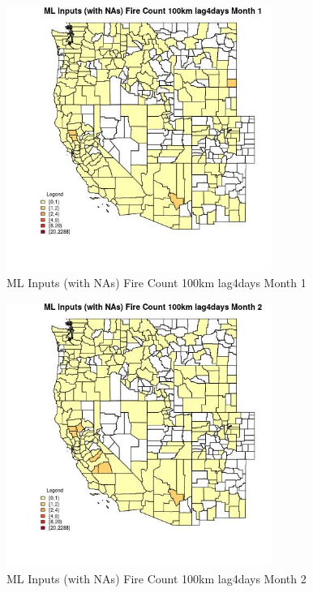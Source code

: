 \begin{figure} 
\centering  
\includegraphics[width=0.77\textwidth]{Code_Outputs/Report_ML_input_PM25_Step4_part_e_de_duplicated_aves_compiled_2019-05-20wNAs_CountyFire_Count_100km_lag4daysmedianMonth1.jpg} 
\caption{\label{fig:Report_ML_input_PM25_Step4_part_e_de_duplicated_aves_compiled_2019-05-20wNAsCountyFire_Count_100km_lag4daysmedianMonth1}ML Inputs (with NAs) Fire Count 100km lag4days Month 1} 
\end{figure} 
 

\begin{figure} 
\centering  
\includegraphics[width=0.77\textwidth]{Code_Outputs/Report_ML_input_PM25_Step4_part_e_de_duplicated_aves_compiled_2019-05-20wNAs_CountyFire_Count_100km_lag4daysmedianMonth2.jpg} 
\caption{\label{fig:Report_ML_input_PM25_Step4_part_e_de_duplicated_aves_compiled_2019-05-20wNAsCountyFire_Count_100km_lag4daysmedianMonth2}ML Inputs (with NAs) Fire Count 100km lag4days Month 2} 
\end{figure} 
 

